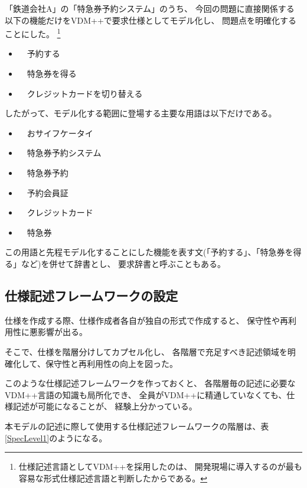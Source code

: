 「鉄道会社A」の「特急券予約システム」のうち、
今回の問題に直接関係する
以下の機能だけをVDM++\cite{Kyushu2016PP}で要求仕様としてモデル化し、
問題点を明確化することにした。
\footnote{仕様記述言語としてVDM++を採用したのは、
開発現場に導入するのが最も容易な形式仕様記述言語と判断したからである。
}

\begin{itemize}
\item　予約する
\item　特急券を得る
\item　クレジットカードを切り替える
\end{itemize} 

したがって、モデル化する範囲に登場する主要な用語は以下だけである。
\begin{itemize}
\item　おサイフケータイ
\item　特急券予約システム
\item　特急券予約
\item　予約会員証
\item　クレジットカード
\item　特急券
\end{itemize} 

この用語と先程モデル化することにした機能を表す文(「予約する」、「特急券を得る」など)を併せて辞書とし、
要求辞書と呼ぶこともある。

\subsection {仕様記述フレームワークの設定}
	\label{sec:specFM}

仕様を作成する際、仕様作成者各自が独自の形式で作成すると、
保守性や再利用性に悪影響が出る。

そこで、仕様を階層分けしてカプセル化し、
各階層で充足すべき記述領域を明確化して、保守性と再利用性の向上を図った。

このような仕様記述フレームワークを作っておくと、
各階層毎の記述に必要なVDM++言語の知識も局所化でき、
全員がVDM++に精通していなくても、仕様記述が可能になることが、
経験上分かっている。

本モデルの記述に際して使用する仕様記述フレームワークの階層は、表\ref{SpecLevel1}のようになる。

